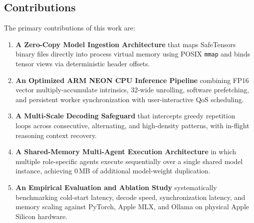 \documentclass[10pt,twocolumn]{article}
\begin{document}
\subsection{Contributions}
The primary contributions of this work are:
\begin{enumerate}
    \item \textbf{A Zero-Copy Model Ingestion Architecture} that maps SafeTensors binary files directly into process virtual memory using POSIX \texttt{mmap} and binds tensor views via deterministic header offsets.
    \item \textbf{An Optimized ARM NEON CPU Inference Pipeline} combining FP16 vector multiply-accumulate intrinsics, 32-wide unrolling, software prefetching, and persistent worker synchronization with user-interactive QoS scheduling.
    \item \textbf{A Multi-Scale Decoding Safeguard} that intercepts greedy repetition loops across consecutive, alternating, and high-density patterns, with in-flight reasoning context recovery.
    \item \textbf{A Shared-Memory Multi-Agent Execution Architecture} in which multiple role-specific agents execute sequentially over a single shared model instance, achieving 0\,MB of additional model-weight duplication.
    \item \textbf{An Empirical Evaluation and Ablation Study} systematically benchmarking cold-start latency, decode speed, synchronization latency, and memory scaling against PyTorch, Apple MLX, and Ollama on physical Apple Silicon hardware.
\end{enumerate}
\end{document}
